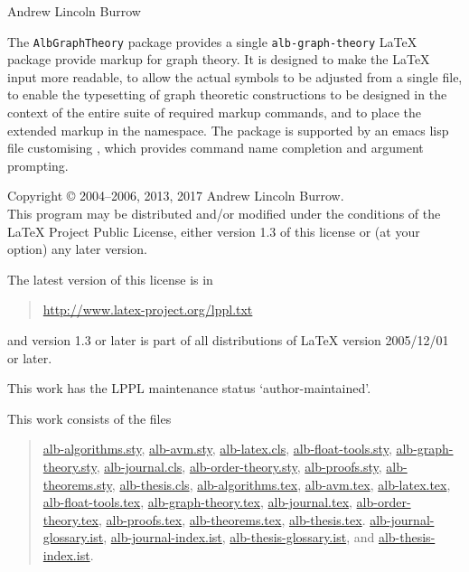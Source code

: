 \documentclass[11pt,a4paper,oneside,titlepage]{alb-latex}
\begin{document}


\begin{albTitlePage}


  Andrew Lincoln Burrow


  The \texttt{AlbGraphTheory} package provides a single
  \texttt{alb-graph-theory} \LaTeX{} package provide markup for graph
  theory.  It is designed to make the \LaTeX{} input more readable, to
  allow the actual symbols to be adjusted from a single file, to enable
  the typesetting of graph theoretic constructions to be designed in the
  context of the entire suite of required markup commands, and to place
  the extended markup in the \albLogo{} namespace.  The package is
  supported by an emacs lisp file customising \AUCTeX{}, which provides
  command name completion and argument prompting.



  Copyright \copyright{} 2004--2006, 2013, 2017 Andrew Lincoln Burrow.\\
  This program may be distributed and/or modified under the conditions
  of the \LaTeX{} Project Public License, either version 1.3 of this
  license or (at your option) any later version.

  \medskip{}

  The latest version of this license is in
  \begin{quote}
    \url{http://www.latex-project.org/lppl.txt}
  \end{quote}
  and version 1.3 or later is part of all distributions of LaTeX version
  2005/12/01 or later.

  \medskip{}

  This work has the LPPL maintenance status `author-maintained'.

  \medskip{}

  This work consists of the files
  \begin{quote}
    \begin{flushleft}
      \url{alb-algorithms.sty}, \url{alb-avm.sty}, \url{alb-latex.cls},
      \url{alb-float-tools.sty}, \url{alb-graph-theory.sty},
      \url{alb-journal.cls}, \url{alb-order-theory.sty},
      \url{alb-proofs.sty}, \url{alb-theorems.sty},
      \url{alb-thesis.cls}, \url{alb-algorithms.tex}, \url{alb-avm.tex},
      \url{alb-latex.tex}, \url{alb-float-tools.tex},
      \url{alb-graph-theory.tex}, \url{alb-journal.tex},
      \url{alb-order-theory.tex}, \url{alb-proofs.tex},
      \url{alb-theorems.tex}, \url{alb-thesis.tex}.
      \url{alb-journal-glossary.ist}, \url{alb-journal-index.ist},
      \url{alb-thesis-glossary.ist}, and \url{alb-thesis-index.ist}.
    \end{flushleft}
  \end{quote}



\end{albTitlePage}
\end{document}
